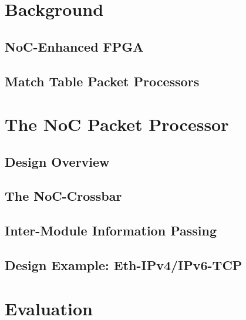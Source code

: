 \documentclass[conference,letterpaper]{IEEEtran}
\newcommand{\abovesectitle}{0pt}
\newcommand{\undersectitle}{0pt}
\renewcommand{\abovesectitle}{-4pt}
\renewcommand{\undersectitle}{-4pt}
\begin{document}
\section{Background}
\vspace{\undersectitle}
%
\subsection{NoC-Enhanced FPGA}
\label{sec:noc-fpga}

%
\subsection{Match Table Packet Processors}
\label{sec:bgd}

%
%
\vspace{\abovesectitle}
\section{The NoC Packet Processor}
\label{sec:design}
\vspace{\undersectitle}
%
\subsection{Design Overview}

%
\subsection{The NoC-Crossbar}

%
\subsection{Inter-Module Information Passing}

%
\subsection{Design Example: Eth-IPv4/IPv6-TCP}
\label{sec:design-example}

%
%
\vspace{\abovesectitle}
\section{Evaluation}
\label{sec:eval}
\vspace{\undersectitle}
%
\end{document}
